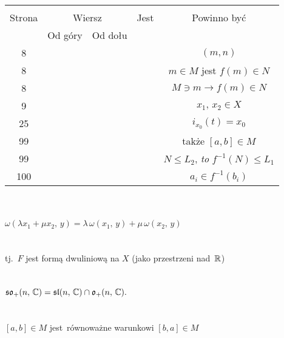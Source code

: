\documentclass[a4paper,11pt]{article}
\begin{document}




\begin{center}
  \begin{tabular}{|c|c|c|c|c|}
    \hline
    & \multicolumn{2}{c|}{} & & \\
    Strona & \multicolumn{2}{c|}{Wiersz} & Jest
                              & Powinno być \\ \cline{2-3}
    & Od góry & Od dołu & & \\
    \hline
    8   & & & & $( m, n )$ \\
    8   & & & & $m \in M$ jest $f( m ) \in N$ \\
    8   & & & & $M \ni m \to f( m ) \in N$ \\
    9   & & & & $x_{ 1 }, \, x_{ 2 } \in X$ \\
    25  & & & & $i_{ x_{ 0 } }( t ) = x_{ 0 }$ \\
    99  & & & & także $[ a, b ] \in M$ \\
    99  & & & & $N \leq L_{ 2 }$, \emph{to} $f^{ -1 }( N ) \leq L_{ 1 }$ \\
    100 & & & & $a_{ i } \in f^{ -1 }( b_{ i } )$ \\
    \hline
  \end{tabular}
\end{center}
\noi
{} \\
\Jest \\
\Pow
$\omega( \lambda x_{ 1 } + \mu x_{ 2 },\, y ) = \lambda \, \omega( x_{
  1 },\, y ) + \mu \, \omega( x_{ 2 },\, y )$ \\
 \\
\Jest \\
\Pow tj.~$F$ jest formą dwuliniową na $X$ (jako przestrzeni nad~$\mathbb{R}$) \\
 \\
\Jest \\
\Pow $\mathfrak{so}_{ + }( n,\, \mathbb{C} ) = \mathfrak{sl}( n,\, \mathbb{C} ) \cap
\mathfrak{o}_{ + }( n,\, \mathbb{C} ) \textrm{.}$ \\
 \\
\Jest \\
\Pow $[ a, b ] \in M$ jest~równoważne warunkowi $[ b, a ] \in M$ \\
\end{document}
